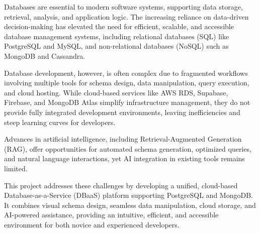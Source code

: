 

Databases are essential to modern software systems, supporting data storage, retrieval, analysis, and application logic. The increasing reliance on data-driven decision-making has elevated the need for efficient, scalable, and accessible database management systems, including relational databases (SQL) like PostgreSQL and MySQL, and non-relational databases (NoSQL) such as MongoDB and Cassandra.

Database development, however, is often complex due to fragmented workflows involving multiple tools for schema design, data manipulation, query execution, and cloud hosting. While cloud-based services like AWS RDS, Supabase, Firebase, and MongoDB Atlas simplify infrastructure management, they do not provide fully integrated development environments, leaving inefficiencies and steep learning curves for developers.

Advances in artificial intelligence, including Retrieval-Augmented Generation (RAG), offer opportunities for automated schema generation, optimized queries, and natural language interactions, yet AI integration in existing tools remains limited.

This project addresses these challenges by developing a unified, cloud-based Database-as-a-Service (DBaaS) platform supporting PostgreSQL and MongoDB. It combines visual schema design, seamless data manipulation, cloud storage, and AI-powered assistance, providing an intuitive, efficient, and accessible environment for both novice and experienced developers.